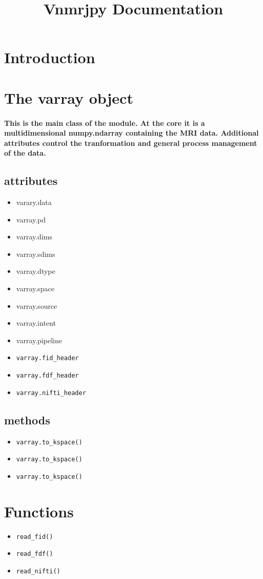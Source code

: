 \documentclass[a4paper]{article}
\begin{document}
\title{Vnmrjpy Documentation}
\maketitle

\section{Introduction}
\section{The varray object}
\paragraph{
This is the main class of the module. At the core it is a multidimensional
numpy.ndarray containing the MRI data. Additional attributes control the
tranformation and general process management of the data. 
}
\subsection{attributes}

\begin{itemize}
\item varary.data
\item varray.pd
\item varray.dims
\item varray.sdims
\item varray.dtype
\item varray.space
\item varray.source
\item varray.intent
\item varray.pipeline
\item \texttt{varray.fid\_header}
\item \texttt{varray.fdf\_header}
\item \texttt{varray.nifti\_header}

\end{itemize}

\subsection{methods}
\begin{itemize}

\item \texttt{varray.to\_kspace()}
\item \texttt{varray.to\_kspace()}
\item \texttt{varray.to\_kspace()}

\end{itemize}

\section{Functions}

\begin{itemize}
\item \texttt{read\_fid()}
\item \texttt{read\_fdf()}
\item \texttt{read\_nifti()}

\end{itemize}
\end{document}

